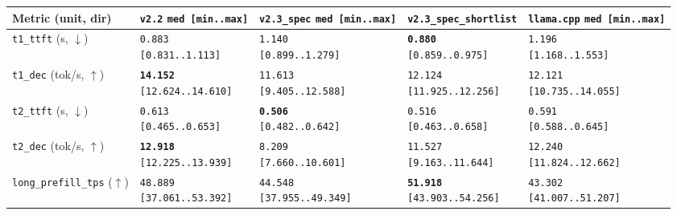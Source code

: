 \documentclass[11pt,a4paper]{article}
\begin{document}
\begin{table}[h]
\centering
\footnotesize
\setlength{\tabcolsep}{3.5pt}
\begin{tabular}{@{}lllll@{}}
\toprule
Metric (unit, dir) & \texttt{v2.2} \texttt{med [min..max]} & \texttt{v2.3\_spec} \texttt{med [min..max]} & \texttt{v2.3\_spec\_shortlist} & \texttt{llama.cpp} \texttt{med [min..max]} \\
\midrule
\texttt{t1\_ttft} (s, $\downarrow$) & \shortstack[l]{\texttt{0.883}\\\scriptsize\texttt{[0.831..1.113]}} & \shortstack[l]{\texttt{1.140}\\\scriptsize\texttt{[0.899..1.279]}} & \shortstack[l]{\textbf{\texttt{0.880}}\\\scriptsize\texttt{[0.859..0.975]}} & \shortstack[l]{\texttt{1.196}\\\scriptsize\texttt{[1.168..1.553]}} \\
\texttt{t1\_dec} (tok/s, $\uparrow$) & \shortstack[l]{\textbf{\texttt{14.152}}\\\scriptsize\texttt{[12.624..14.610]}} & \shortstack[l]{\texttt{11.613}\\\scriptsize\texttt{[9.405..12.588]}} & \shortstack[l]{\texttt{12.124}\\\scriptsize\texttt{[11.925..12.256]}} & \shortstack[l]{\texttt{12.121}\\\scriptsize\texttt{[10.735..14.055]}} \\
\texttt{t2\_ttft} (s, $\downarrow$) & \shortstack[l]{\texttt{0.613}\\\scriptsize\texttt{[0.465..0.653]}} & \shortstack[l]{\textbf{\texttt{0.506}}\\\scriptsize\texttt{[0.482..0.642]}} & \shortstack[l]{\texttt{0.516}\\\scriptsize\texttt{[0.463..0.658]}} & \shortstack[l]{\texttt{0.591}\\\scriptsize\texttt{[0.588..0.645]}} \\
\texttt{t2\_dec} (tok/s, $\uparrow$) & \shortstack[l]{\textbf{\texttt{12.918}}\\\scriptsize\texttt{[12.225..13.939]}} & \shortstack[l]{\texttt{8.209}\\\scriptsize\texttt{[7.660..10.601]}} & \shortstack[l]{\texttt{11.527}\\\scriptsize\texttt{[9.163..11.644]}} & \shortstack[l]{\texttt{12.240}\\\scriptsize\texttt{[11.824..12.662]}} \\
\texttt{long\_prefill\_tps} ($\uparrow$) & \shortstack[l]{\texttt{48.889}\\\scriptsize\texttt{[37.061..53.392]}} & \shortstack[l]{\texttt{44.548}\\\scriptsize\texttt{[37.955..49.349]}} & \shortstack[l]{\textbf{\texttt{51.918}}\\\scriptsize\texttt{[43.903..54.256]}} & \shortstack[l]{\texttt{43.302}\\\scriptsize\texttt{[41.007..51.207]}} \\

\end{tabular}
\end{table}
\end{document}
